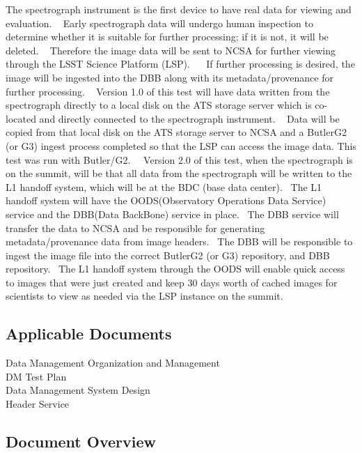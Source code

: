 \documentclass[DM,lsstdraft,STR,toc]{lsstdoc}
\begin{document}
The spectrograph instrument is the first device to have real data for
viewing and evaluation. ~ Early spectrograph data will undergo human
inspection to determine whether it is suitable for further processing;
if it is not, it will be deleted. ~ Therefore the image data will be
sent to NCSA for further viewing through the LSST Science Platform
(LSP). ~ ~If further processing is desired, the image will be ingested
into the DBB along with its metadata/provenance for further processing.
~ Version 1.0 of this test will have data written from the spectrograph
directly to a local disk on the ATS storage server which is co-located
and directly connected to the spectrograph instrument. ~ Data will be
copied from that local disk on the ATS storage server to NCSA and a
ButlerG2 (or G3) ingest process completed so that the LSP can access the
image data. This test was run with Butler/G2.~ ~Version 2.0 of this
test, when the spectrograph is on the summit, will be that all data from
the spectrograph will be written to the L1 handoff system, which will be
at the BDC (base data center). ~The L1 handoff system will have the
OODS(Observatory Operations Data Service) service and the DBB(Data
BackBone) service in place. ~The DBB service will transfer the data to
NCSA and be responsible for generating metadata/provenance data from
image headers. ~The DBB will be responsible to ingest the image file
into the correct ButlerG2 (or G3) repository, and DBB repository. ~The
L1 handoff system through the OODS will enable quick access to images
that were just created and keep 30 days worth of cached images for
scientists to view as needed via the LSP instance on the summit.
~\\[2\baselineskip]

\subsection{Applicable Documents}\label{applicable-documents}

 Data Management Organization and Management\\
 DM Test Plan\\
 Data Management System Design\\
 Header Service~


\subsection{Document Overview}
\label{sect:docoverview}
\end{document}
